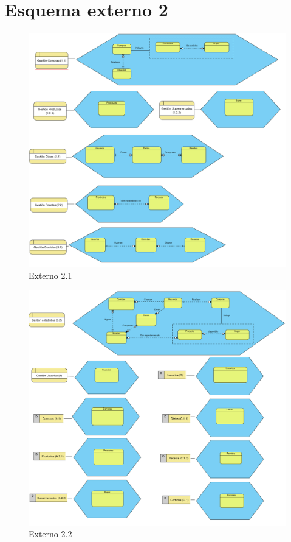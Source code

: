 \documentclass[a4paper,12pt]{report}
\begin{document}
\section{Esquema externo 2}
\label{sec-6-2}
\begin{figure}[!htp]
\centering
\includegraphics[width=1\linewidth]{./refinamientos/externo21.png}
\caption{Externo 2.1}
\label{fig:Externo 2.1}
\medskip
\footnotesize
{}
\end{figure}

\begin{figure}[!htp]
\centering
\includegraphics[width=1\linewidth]{./refinamientos/externo22.png}
\caption{Externo 2.2}
\label{fig:Externo 2.2}
\medskip
\footnotesize
{}
\end{figure}
\end{document}
